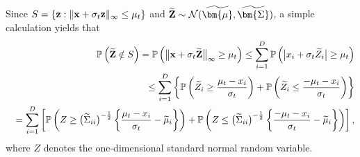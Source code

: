 \documentclass[11pt,a4paper,final]{article}
\numberwithin{equation}{section}
\theoremstyle{remark}
\def\cN{\mathcal N}
\newcommand{\bx}{{\bf x}}
\newcommand{\bz}{{\bf z}}
\newcommand{\bZ}{{\bf Z}}
\newcommand{\bbP}{{\mathbb P}}
\newcommand{\bSigma}{\bm{\Sigma}}
\newcommand{\bmu}{\bm{\mu}}
\newcommand{\bean}{\setlength\arraycolsep{1pt}\begin{eqnarray*}}
\newcommand{\eean}{\end{eqnarray*}}
\begin{document}
Since $S = \{ \bz : \| \bx +  \sigma_{t} \bz \|_{\infty} \leq \mu_t \}$ and $\widetilde \bZ \sim \cN (\widetilde \bmu, \widetilde \bSigma)$, 
a simple calculation yields that
\bean
&& \bbP \left( \widetilde \bZ \notin S \right)
= \bbP \left( \big\| \bx + \sigma_t \widetilde \bZ \big\|_{\infty} \geq \mu_t \right)
\leq \sum_{i=1}^{D} \bbP \left( \big\vert x_i + \sigma_t \widetilde Z_i \big\vert \geq \mu_{t} \right)
\\
&& \leq \sum_{i=1}^{D} \left\{ \bbP \left( \widetilde Z_i \geq \frac{\mu_{t} - x_i}{\sigma_{t}}  \right) + 
\bbP \left( \widetilde Z_i \leq \frac{-\mu_{t} - x_i}{\sigma_{t}}  \right) 
\right\}
\\
&& = \sum_{i=1}^{D} \left[  \bbP \left( Z \geq \big( \widetilde \Sigma_{ii} \big)^{-\frac{1}{2}} \left\{ \frac{\mu_{t} - x_i}{\sigma_{t} } - \widetilde \mu_i \right\} \right) 
+ \bbP \left( Z \leq \big( \widetilde \Sigma_{ii} \big)^{-\frac{1}{2}} \left\{ \frac{- \mu_{t} - x_i}{\sigma_{t} } - \widetilde \mu_i \right\} \right) 
\right],
\eean
where $Z$ denotes the one-dimensional standard normal random variable.
\end{document}
